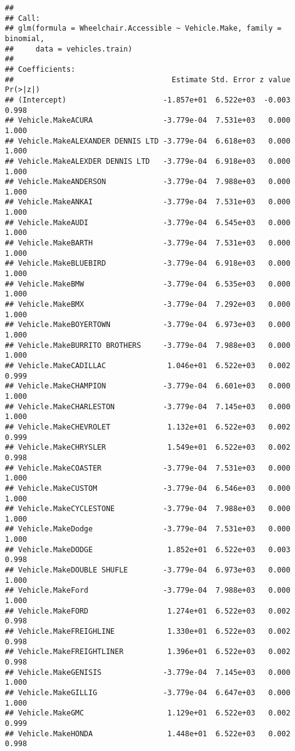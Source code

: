 \documentclass[
]{article}
\begin{document}
\begin{verbatim}
## 
## Call:
## glm(formula = Wheelchair.Accessible ~ Vehicle.Make, family = binomial, 
##     data = vehicles.train)
## 
## Coefficients:
##                                    Estimate Std. Error z value Pr(>|z|)
## (Intercept)                      -1.857e+01  6.522e+03  -0.003    0.998
## Vehicle.MakeACURA                -3.779e-04  7.531e+03   0.000    1.000
## Vehicle.MakeALEXANDER DENNIS LTD -3.779e-04  6.618e+03   0.000    1.000
## Vehicle.MakeALEXDER DENNIS LTD   -3.779e-04  6.918e+03   0.000    1.000
## Vehicle.MakeANDERSON             -3.779e-04  7.988e+03   0.000    1.000
## Vehicle.MakeANKAI                -3.779e-04  7.531e+03   0.000    1.000
## Vehicle.MakeAUDI                 -3.779e-04  6.545e+03   0.000    1.000
## Vehicle.MakeBARTH                -3.779e-04  7.531e+03   0.000    1.000
## Vehicle.MakeBLUEBIRD             -3.779e-04  6.918e+03   0.000    1.000
## Vehicle.MakeBMW                  -3.779e-04  6.535e+03   0.000    1.000
## Vehicle.MakeBMX                  -3.779e-04  7.292e+03   0.000    1.000
## Vehicle.MakeBOYERTOWN            -3.779e-04  6.973e+03   0.000    1.000
## Vehicle.MakeBURRITO BROTHERS     -3.779e-04  7.988e+03   0.000    1.000
## Vehicle.MakeCADILLAC              1.046e+01  6.522e+03   0.002    0.999
## Vehicle.MakeCHAMPION             -3.779e-04  6.601e+03   0.000    1.000
## Vehicle.MakeCHARLESTON           -3.779e-04  7.145e+03   0.000    1.000
## Vehicle.MakeCHEVROLET             1.132e+01  6.522e+03   0.002    0.999
## Vehicle.MakeCHRYSLER              1.549e+01  6.522e+03   0.002    0.998
## Vehicle.MakeCOASTER              -3.779e-04  7.531e+03   0.000    1.000
## Vehicle.MakeCUSTOM               -3.779e-04  6.546e+03   0.000    1.000
## Vehicle.MakeCYCLESTONE           -3.779e-04  7.988e+03   0.000    1.000
## Vehicle.MakeDodge                -3.779e-04  7.531e+03   0.000    1.000
## Vehicle.MakeDODGE                 1.852e+01  6.522e+03   0.003    0.998
## Vehicle.MakeDOUBLE SHUFLE        -3.779e-04  6.973e+03   0.000    1.000
## Vehicle.MakeFord                 -3.779e-04  7.988e+03   0.000    1.000
## Vehicle.MakeFORD                  1.274e+01  6.522e+03   0.002    0.998
## Vehicle.MakeFREIGHLINE            1.330e+01  6.522e+03   0.002    0.998
## Vehicle.MakeFREIGHTLINER          1.396e+01  6.522e+03   0.002    0.998
## Vehicle.MakeGENISIS              -3.779e-04  7.145e+03   0.000    1.000
## Vehicle.MakeGILLIG               -3.779e-04  6.647e+03   0.000    1.000
## Vehicle.MakeGMC                   1.129e+01  6.522e+03   0.002    0.999
## Vehicle.MakeHONDA                 1.448e+01  6.522e+03   0.002    0.998

\end{verbatim}
\end{document}
